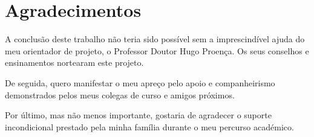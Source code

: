 \chapter*{Agradecimentos}
\label{chap:ack}

A conclusão deste trabalho não teria sido possível sem a imprescindível ajuda do meu orientador de projeto, o Professor Doutor Hugo Proença. Os seus conselhos e ensinamentos nortearam este projeto.\newline

\noindent De seguida, quero manifestar o meu apreço pelo apoio e companheirismo demonstrados pelos meus colegas de curso e amigos próximos.\newline

\noindent Por último, mas não menos importante, gostaria de agradecer o suporte incondicional prestado pela minha família durante o meu percurso académico.